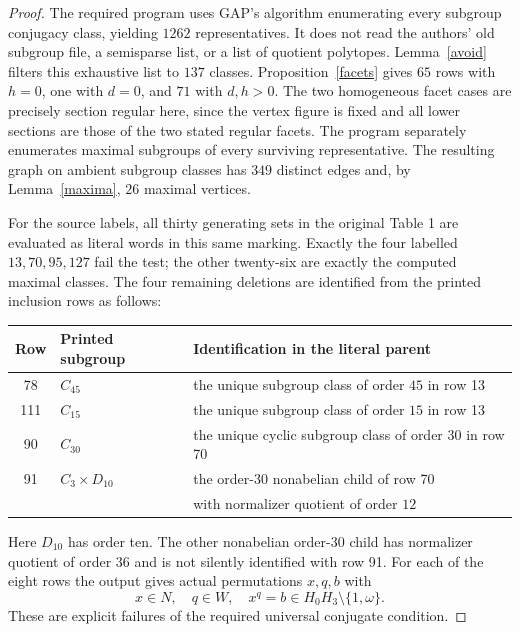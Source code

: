 \documentclass[11pt,a4paper]{article}
\begin{document}
\begin{proof}
The required program uses GAP's algorithm enumerating every subgroup conjugacy class, yielding $1262$ representatives. It does not read the authors' old subgroup file, a semisparse list, or a list of quotient polytopes. Lemma~\ref{avoid} filters this exhaustive list to $137$ classes. Proposition~\ref{facets} gives $65$ rows with $h=0$, one with $d=0$, and $71$ with $d,h>0$. The two homogeneous facet cases are precisely section regular here, since the vertex figure is fixed and all lower sections are those of the two stated regular facets. The program separately enumerates maximal subgroups of every surviving representative. The resulting graph on ambient subgroup classes has $349$ distinct edges and, by Lemma~\ref{maxima}, $26$ maximal vertices.

For the source labels, all thirty generating sets in the original Table 1 are evaluated as literal words in this same marking. Exactly the four labelled $13,70,95,127$ fail the test; the other twenty-six are exactly the computed maximal classes. The four remaining deletions are identified from the printed inclusion rows as follows:
\begin{center}\begin{tabular}{cll}\toprule
Row&Printed subgroup&Identification in the literal parent\\\midrule
78&$C_{45}$&the unique subgroup class of order $45$ in row 13\\
111&$C_{15}$&the unique subgroup class of order $15$ in row 13\\
90&$C_{30}$&the unique cyclic subgroup class of order $30$ in row 70\\
91&$C_3\times D_{10}$&the order-$30$ nonabelian child of row 70\\
&&with normalizer quotient of order $12$\\\bottomrule\end{tabular}\end{center}
Here $D_{10}$ has order ten. The other nonabelian order-$30$ child has normalizer quotient of order $36$ and is not silently identified with row 91. For each of the eight rows the output gives actual permutations $x,q,b$ with
\[
 x\in N,\quad q\in W,\quad x^q=b\in H_0H_3\setminus\{1,\omega\}.
\]
These are explicit failures of the required universal conjugate condition.


\end{proof}
\end{document}
